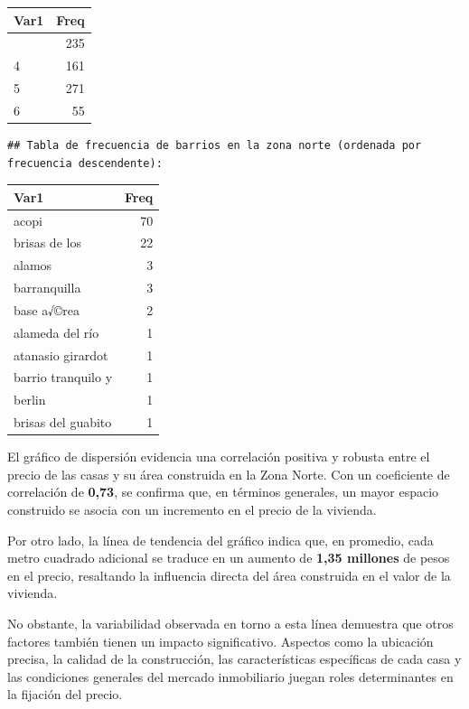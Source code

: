 \documentclass[
]{article}
\begin{document}
\begin{longtable}[]{@{}lr@{}}
\toprule\noalign{}
Var1 & Freq \\
\midrule\noalign{}
\endhead
\bottomrule\noalign{}
\endlastfoot
3 & 235 \\
4 & 161 \\
5 & 271 \\
6 & 55 \\
\end{longtable}

\begin{verbatim}
## Tabla de frecuencia de barrios en la zona norte (ordenada por frecuencia descendente):
\end{verbatim}

\begin{longtable}[]{@{}lr@{}}
\toprule\noalign{}
Var1 & Freq \\
\midrule\noalign{}
\endhead
\bottomrule\noalign{}
\endlastfoot
acopi & 70 \\
brisas de los & 22 \\
alamos & 3 \\
barranquilla & 3 \\
base a√©rea & 2 \\
alameda del río & 1 \\
atanasio girardot & 1 \\
barrio tranquilo y & 1 \\
berlin & 1 \\
brisas del guabito & 1 \\
\end{longtable}

El gráfico de dispersión evidencia una correlación positiva y robusta
entre el precio de las casas y su área construida en la Zona Norte. Con
un coeficiente de correlación de \textbf{0,73}, se confirma que, en
términos generales, un mayor espacio construido se asocia con un
incremento en el precio de la vivienda.

Por otro lado, la línea de tendencia del gráfico indica que, en
promedio, cada metro cuadrado adicional se traduce en un aumento de
\textbf{1,35 millones} de pesos en el precio, resaltando la influencia
directa del área construida en el valor de la vivienda.

No obstante, la variabilidad observada en torno a esta línea demuestra
que otros factores también tienen un impacto significativo. Aspectos
como la ubicación precisa, la calidad de la construcción, las
características específicas de cada casa y las condiciones generales del
mercado inmobiliario juegan roles determinantes en la fijación del
precio.
\end{document}
